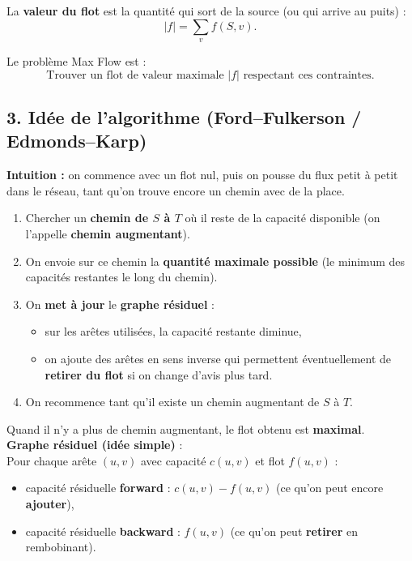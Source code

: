 La \textbf{valeur du flot} est la quantité qui sort de la source (ou qui arrive au puits) :
\[
    |f| = \sum_{v} f(S,v).
\]

Le problème Max Flow est :  
\[
\text{Trouver un flot de valeur maximale } |f| \text{ respectant ces contraintes.}
\]

\subsection*{3. Idée de l’algorithme (Ford–Fulkerson / Edmonds–Karp)}

\textbf{Intuition :} on commence avec un flot nul, puis on \og pousse\fg{} du flux petit à petit dans le réseau, tant qu’on trouve encore un chemin avec de la place.

\begin{enumerate}
    \item Chercher un \textbf{chemin de $S$ à $T$} où il reste de la capacité disponible  
          (on l’appelle \textbf{chemin augmentant}).
    \item On envoie sur ce chemin la \textbf{quantité maximale possible} (le minimum des capacités restantes le long du chemin).
    \item On \textbf{met à jour} le \textbf{graphe résiduel} :
    \begin{itemize}
        \item sur les arêtes utilisées, la capacité restante diminue,
        \item on ajoute des arêtes \og en sens inverse\fg{} qui permettent éventuellement de \textbf{retirer du flot} si on change d’avis plus tard.
    \end{itemize}
    \item On recommence tant qu’il existe un chemin augmentant de $S$ à $T$.
\end{enumerate}

Quand il n’y a plus de chemin augmentant, le flot obtenu est \textbf{maximal}. \\

\textbf{Graphe résiduel (idée simple)} : \\
Pour chaque arête $(u,v)$ avec capacité $c(u,v)$ et flot $f(u,v)$ :
\begin{itemize}
    \item capacité résiduelle \textbf{forward} : $c(u,v) - f(u,v)$ (ce qu’on peut encore \textbf{ajouter}),
    \item capacité résiduelle \textbf{backward} : $f(u,v)$ (ce qu’on peut \textbf{retirer} en rembobinant).
\end{itemize}

